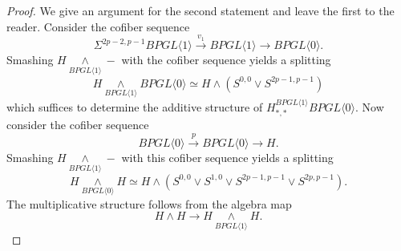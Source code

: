\documentclass{amsart}
\theoremstyle{plain}
\numberwithin{theorem}{section}
\numberwithin{equation}{section}
\numberwithin{figure}{section}
\newcommand{\0}{\langle 0 \rangle }
\begin{document}
\begin{proof}
    We give an argument for the second statement and leave the first to the reader. Consider the cofiber sequence
    \[
    \Sigma^{2p-2, p-1}BPGL \langle 1 \rangle \xrightarrow{v_1} BPGL \langle 1 \rangle \xrightarrow{} BPGL \langle 0 \rangle.
    \]
    Smashing $H \underset{BPGL \langle 1 \rangle}{ \wedge } -$ with the cofiber sequence yields a splitting 
    \[
    H \underset{ BPGL \langle 1 \rangle }{\wedge} BPGL \langle 0 \rangle \simeq H\wedge (S^{0,0} \vee {S^{2p-1,p-1}})
    \]
    which suffices to determine the additive structure of $H_{*,*}^{BPGL \langle 1 \rangle} BPGL \langle 0 \rangle$. Now consider the cofiber sequence
   \[
    BPGL \langle 0 \rangle \xrightarrow{p} BPGL \langle 0 \rangle \xrightarrow{} H.
    \]
    Smashing $H\underset{BPGL \langle 1 \rangle}{ \wedge } -$ with this cofiber sequence yields a splitting \[
    H \underset{ BPGL \langle 0 \rangle }{\wedge} H \simeq H \wedge (S^{0,0} \vee S^{1,0} \vee {S^{2p-1,p-1}} \vee {S^{2p,p-1}}) .
    \]
    The multiplicative structure follows from the algebra map 
    \[ 
    H \wedge H \to H \underset{BPGL \langle 1 \rangle}{ \wedge } H .
    \]
\end{proof}
\end{document}

